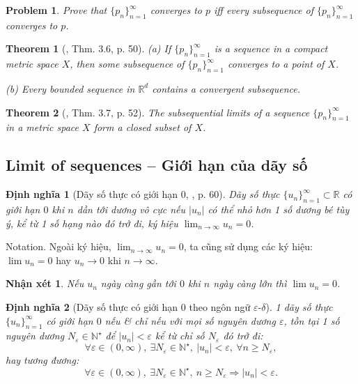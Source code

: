 \documentclass{article}
\newtheorem{dinhnghia}{Định nghĩa}
\newtheorem{nhanxet}{Nhận xét}
\newtheorem{problem}{Problem}
\newtheorem{theorem}{Theorem}
\begin{document}
\begin{problem}
	Prove that $\{p_n\}_{n=1}^\infty$ converges to $p$ iff every subsequence of $\{p_n\}_{n=1}^\infty$ converges to $p$.
\end{problem}

\begin{theorem}[\cite{Rudin1976}, Thm. 3.6, p. 50]
	\item(a) If $\{p_n\}_{n=1}^\infty$ is a sequence in a compact metric space $X$, then some subsequence of $\{p_n\}_{n=1}^\infty$ converges to a point of $X$.
	\item(b) Every bounded sequence in $\mathbb{R}^d$ contains a convergent subsequence.
\end{theorem}

\begin{theorem}[\cite{Rudin1976}, Thm. 3.7, p. 52]
	The subsequential limits of a sequence $\{p_n\}_{n=1}^\infty$ in a metric space $X$ form a closed subset of $X$.
\end{theorem}


\subsection{Limit of sequences -- Giới hạn của dãy số}

\begin{dinhnghia}[Dãy số thực có giới hạn $0$,  \cite{SGK_Toan_11_CD_tap_1}, p. 60]
	\label{def: sequence lim 0}
	Dãy số thực $\{u_n\}_{n=1}^\infty\subset\mathbb{R}$ có giới hạn $0$ khi $n$ dần tới dương vô cực nếu $|u_n|$ có thể nhỏ hơn 1 số dương bé tùy ý, kể từ 1 số hạng nào đó trở đi, ký hiệu $\lim_{n\to\infty} u_n = 0$.
\end{dinhnghia}
{\sf Notation.} Ngoài ký hiệu, $\lim_{n\to\infty} u_n = 0$, ta cũng sử dụng các ký hiệu: $\lim u_n = 0$ hay $u_n\to0$ khi $n\to\infty$.

\begin{nhanxet}
	Nếu $u_n$ ngày càng gần tới $0$ khi $n$ ngày càng lớn thì $\lim u_n = 0$.
\end{nhanxet}

\begin{dinhnghia}[Dãy số thực có giới hạn $0$ theo ngôn ngữ $\varepsilon$-$\delta$]
	\label{def: sequence lim 0: epsilon-delta}
	1 dãy số thực $\{u_n\}_{n=1}^\infty$ có giới hạn $0$ nếu \& chỉ nếu với mọi số nguyên dương $\varepsilon$, tồn tại 1 số nguyên dương $N_\varepsilon\in\mathbb{N}^\star$ để $|u_n| < \varepsilon$ kể từ chỉ số $N_\varepsilon$ đó trở đi:	
	\begin{equation*}
		\forall\varepsilon\in(0,\infty),\ \exists N_\varepsilon\in\mathbb{N}^\star,\ |u_n| < \varepsilon,\ \forall n\ge N_\varepsilon,
	\end{equation*}
	hay tương đương:
	\begin{equation*}
		\forall\varepsilon\in(0,\infty),\ \exists N_\varepsilon\in\mathbb{N}^\star,\ n\ge N_\varepsilon\Rightarrow|u_n| < \varepsilon.
	\end{equation*}
\end{dinhnghia}
\end{document}
